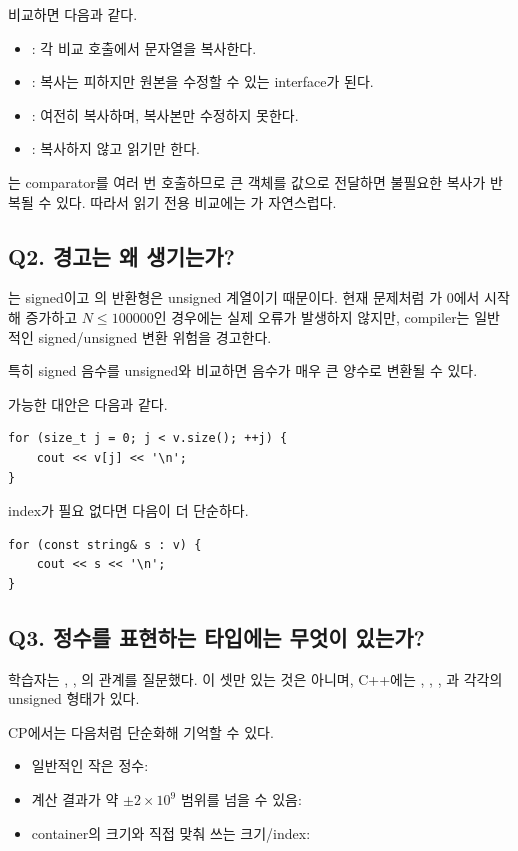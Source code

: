 비교하면 다음과 같다.
\begin{itemize}
  \item {}: 각 비교 호출에서 문자열을 복사한다.
  \item {}: 복사는 피하지만 원본을 수정할 수 있는 interface가 된다.
  \item {}: 여전히 복사하며, 복사본만 수정하지 못한다.
  \item {}: 복사하지 않고 읽기만 한다.
\end{itemize}

는 comparator를 여러 번 호출하므로 큰 객체를 값으로 전달하면 불필요한 복사가 반복될 수 있다. 따라서 읽기 전용 비교에는 가 자연스럽다.

\subsection{Q2.  경고는 왜 생기는가?}
는 signed이고 의 반환형은 unsigned  계열이기 때문이다. 현재 문제처럼 가 0에서 시작해 증가하고 $N\le100000$인 경우에는 실제 오류가 발생하지 않지만, compiler는 일반적인 signed/unsigned 변환 위험을 경고한다.

특히 signed 음수를 unsigned와 비교하면 음수가 매우 큰 양수로 변환될 수 있다.

가능한 대안은 다음과 같다.
\begin{lstlisting}
for (size_t j = 0; j < v.size(); ++j) {
    cout << v[j] << '\n';
}
\end{lstlisting}

index가 필요 없다면 다음이 더 단순하다.
\begin{lstlisting}
for (const string& s : v) {
    cout << s << '\n';
}
\end{lstlisting}

\subsection{Q3. 정수를 표현하는 타입에는 무엇이 있는가?}
학습자는 , , 의 관계를 질문했다. 이 셋만 있는 것은 아니며, C++에는 , , , 과 각각의 unsigned 형태가 있다.

CP에서는 다음처럼 단순화해 기억할 수 있다.
\begin{itemize}
  \item 일반적인 작은 정수: 
  \item 계산 결과가 약 $\pm2\times10^9$ 범위를 넘을 수 있음: 
  \item container의 크기와 직접 맞춰 쓰는 크기/index: 
\end{itemize}

